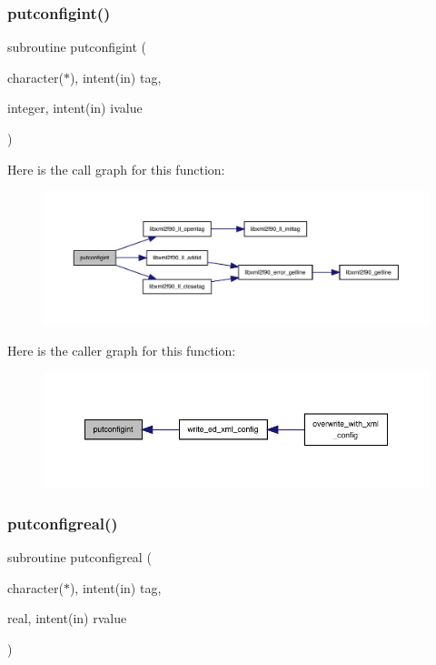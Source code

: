 \subsubsection{\texorpdfstring{putconfigint()}{putconfigint()}}
{\footnotesize\ttfamily subroutine putconfigint (\begin{DoxyParamCaption}\item[{character($\ast$), intent(in)}]{tag,  }\item[{integer, intent(in)}]{ivalue }\end{DoxyParamCaption})}

Here is the call graph for this function\+:
\nopagebreak
\begin{figure}[H]
\begin{center}
\leavevmode
\includegraphics[width=350pt]{ed__xml__config_8f90_a026dfa9d8dcef5376fdabe6f581cc5e6_cgraph}
\end{center}
\end{figure}
Here is the caller graph for this function\+:
\nopagebreak
\begin{figure}[H]
\begin{center}
\leavevmode
\includegraphics[width=350pt]{ed__xml__config_8f90_a026dfa9d8dcef5376fdabe6f581cc5e6_icgraph}
\end{center}
\end{figure}
\mbox{\label{ed__xml__config_8f90_aefca40b018b8204a43d2c6822a83dee9}} 
\subsubsection{\texorpdfstring{putconfigreal()}{putconfigreal()}}
{\footnotesize\ttfamily subroutine putconfigreal (\begin{DoxyParamCaption}\item[{character($\ast$), intent(in)}]{tag,  }\item[{real, intent(in)}]{rvalue }\end{DoxyParamCaption})}


